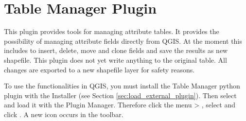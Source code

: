 
\section{Table Manager Plugin}\label{sec:ftools}


This plugin provides tools for managing attribute tables. It provides the 
possibility of managing attribute fields directly from QGIS. At the moment 
this includes to insert, delete, move and clone fields and save the results 
as new shapefile. This plugin does not yet write anything to the original 
table. All changes are exported to a new shapefile layer for safety reasons.


To use the functionalities in QGIS, you must install the Table Manager python 
plugin with the  Installer (see Section 
\ref{sec:load_external_plugin}). Then select and load it with the Plugin Manager. 
Therefore click the menu  > 
, select  and click 
. A new  icon occurs 
in the toolbar.
